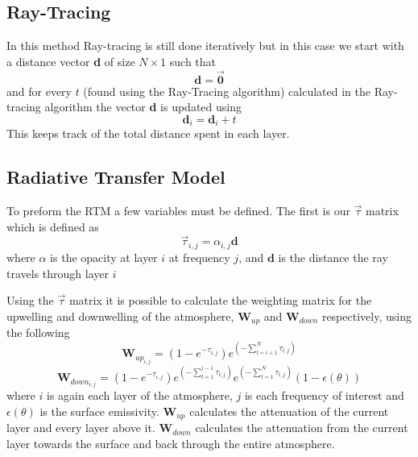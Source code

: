 \subsection{Ray-Tracing}
In this method Ray-tracing is still done iteratively but in this case we start with a distance vector \textbf{d} of size $N \times 1$ such that
\begin{equation*}
\textbf{d} = \vec{\textbf{0}}
\end{equation*}
and for every $t$ (found using the Ray-Tracing algorithm) calculated in the Ray-tracing algorithm the vector \textbf{d} is updated using
\begin{equation}
\textbf{d}_i = \textbf{d}_i + t 
\end{equation}
This keeps track of the total distance spent in each layer.

\subsection{Radiative Transfer Model}

To preform the RTM a few variables must be defined. The first is our $\vec{\tau}$ matrix which is defined as
\begin{equation}
\vec{\tau}_{i,j} = \alpha_{i,j} \textbf{d}
\end{equation}
where $\alpha$ is the opacity at layer $i$ at frequency $j$, and $\textbf{d}$ is the distance the ray travels through layer $i$

Using the $\vec{\tau}$ matrix it is possible to calculate the weighting matrix for the upwelling and downwelling of the atmosphere, $\textbf{W}_{up}$ and $\textbf{W}_{down}$ respectively, using the following
\begin{equation}
\textbf{W}_{up_{i,j}} = (1-e^{-\tau_{i,j}})e^{\left(-\sum_{l=i+1}^N \tau_{l,j}\right)}
\end{equation}
\begin{equation}
\textbf{W}_{down_{i,j}} = (1-e^{-\tau_{i,j}})e^{\left(-\sum_{l=1}^{i-1} \tau_{l,j}\right)} e^{\left(-\sum_{l=1}^{N} \tau_{l,j}\right)} (1- \epsilon(\theta))
\end{equation}
where $i$ is again each layer of the atmosphere, $j$ is each frequency of interest and $\epsilon(\theta)$ is the surface emissivity. $\textbf{W}_{up}$ calculates the attenuation of the current layer and every layer above it. $\textbf{W}_{down}$ calculates the attenuation from the current layer towards the surface and back through the entire atmosphere. 

